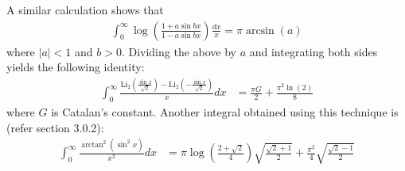 A similar calculation shows that 
\begin{align*}
\int_{0}^{\infty} \log \left( \frac{1+a \sin bx}{1-a \sin bx} \right) \frac{dx}{x} = \pi \arcsin(a)
\end{align*}
where $|a|<1$ and $b>0$. Dividing the above by $a$ and integrating both sides yields the following identity:
\begin{align*}
\int_0^\infty \frac{\text{Li}_2\left(\frac{\sin x}{\sqrt{2}}\right)-\text{Li}_2\left(-\frac{\sin x}{\sqrt{2}}\right)}{x}dx &= \frac{\pi G}{2}+\frac{\pi^2 \ln(2)}{8}
\end{align*}
where $G$ is Catalan's constant. Another integral obtained using this technique is (refer section 3.0.2):
\begin{align*}
\int_0^\infty \frac{\arctan^2 (\sin^2 x)}{x^2} dx &= \pi \log\left(\frac{2+\sqrt{2}}{4}\right)\sqrt{\frac{\sqrt{2}+1}{2}}+\frac{\pi^2}{4} \sqrt{\frac{\sqrt{2}-1}{2}}
\end{align*}